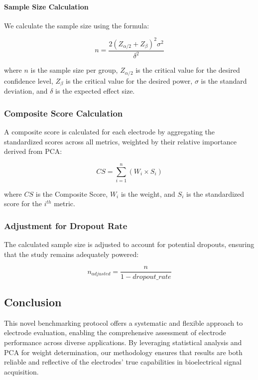 \paragraph{Sample Size Calculation}

We calculate the sample size using the formula:

\[ n = \frac{2(Z_{\alpha/2} + Z_{\beta})^2 \sigma^2}{\delta^2} \]

where \(n\) is the sample size per group, \(Z_{\alpha/2}\) is the critical value for the desired confidence level, \(Z_{\beta}\) is the critical value for the desired power, \(\sigma\) is the standard deviation, and \(\delta\) is the expected effect size.

\subsubsection{Composite Score Calculation}

A composite score is calculated for each electrode by aggregating the standardized scores across all metrics, weighted by their relative importance derived from PCA:

\[ CS = \sum_{i=1}^{n} (W_i \times S_i) \]

where \(CS\) is the Composite Score, \(W_i\) is the weight, and \(S_i\) is the standardized score for the \(i^{th}\) metric.

\subsubsection{Adjustment for Dropout Rate}

The calculated sample size is adjusted to account for potential dropouts, ensuring that the study remains adequately powered:

\[ n_{adjusted} = \frac{n}{1 - dropout\_rate} \]

\subsection{Conclusion}

This novel benchmarking protocol offers a systematic and flexible approach to electrode evaluation, enabling the comprehensive assessment of electrode performance across diverse applications. By leveraging statistical analysis and PCA for weight determination, our methodology ensures that results are both reliable and reflective of the electrodes' true capabilities in bioelectrical signal acquisition.

